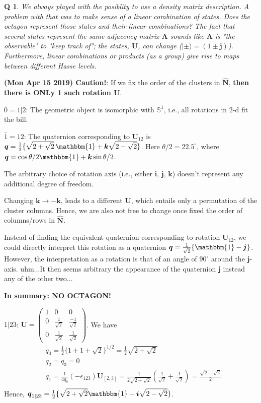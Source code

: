 \documentclass[twocolumn,aps,sort,nofootinbib]{revtex4}
\newtheorem{question}{Q}
\begin{document}
\begin{question}
	We always played  with the posiblity to use a density matrix description. A problem with that was to make sense of a linear combination of \textit{states}.
	Does the octagon represent those states and their linear combinations? The fact that several states represent the same adjacency matrix $\boldsymbol{A}$
	sounds like $\boldsymbol{A}$ is "the observable" to "keep track of"; the \textit{states,} $\boldsymbol{U}$, can change ($\mid\pm\rangle=(1\pm\boldsymbol{j})$). 
	Furthermore, linear combinations or products (as a group) give rise to maps between different Hasse levels.
\end{question}
	\textbf{(Mon Apr 15 2019) Caution!}: If we fix the order of the clusters in $\boldsymbol{\hat{N}}$, \textbf{then there is ONLy 1 such rotation $\boldsymbol{U}$}.

	\textbf{$\bar{0}=1|2$}: The geometric object is isomorphic with $\mathbb{S}^1$, i.e., all rotations in $2$-d fit the bill.

	\textbf{$\bar{1}=12$}: The quaternion corresponding to $\boldsymbol{U}_{12}$ is $\boldsymbol{q}=\frac{1}{2}\{\sqrt{2+\sqrt{2}}\,\mathbbm{1}+\boldsymbol{k}\sqrt{2-\sqrt{2}}\}$.
	Here $\theta/2=22.5^\circ$, where $\boldsymbol{q}=\cos{\theta/2}\mathbbm{1}+\boldsymbol{k}\sin{\theta/2}$.

	The arbitrary choice of rotation axis (i.e., either $\boldsymbol{i},\,\boldsymbol{j},\,\boldsymbol{k}$) doesn't represent any additional degree of freedom.

	Changing $\boldsymbol{k}\to -\boldsymbol{k}$, leads to a different $\boldsymbol{U}$, which entails only a permutation of the cluster columns. Hence, we are also not
	free to change once fixed the order of columns/rows in $\boldsymbol{\hat{N}}$.

	Instead of finding the equivalent quaternion corresponding to rotation $\boldsymbol{U}_{12}$, we could directly interpret this rotation as a quaternion
$\boldsymbol{q}=\frac{1}{\sqrt{2}}\{\mathbbm{1}-\boldsymbol{j}\}$. However, the interpretation as a rotation is that of an angle of $90^\circ$ around
the $\boldsymbol{j}$-axis. uhm...It then seems arbitrary the appearance of the quaternion $\boldsymbol{j}$ instead any of the other two...

	\textbf{In summary: NO OCTAGON!}

	\textbf{$1|23$}: $\boldsymbol{U}=\begin{pmatrix}1&0&0\\0&\frac{1}{\sqrt{2}}&\frac{-1}{\sqrt{2}}\\0&\frac{1}{\sqrt{2}}&\frac{1}{\sqrt{2}}\end{pmatrix}$.
	We have 
	\begin{align*}
		&q_0=\frac{1}{2}\{1+1+\sqrt{2}\}^{1/2}=\frac{1}{2}\sqrt{2+\sqrt{2}}\\
		&q_2=q_3=0\\
		&q_1=\frac{1}{4q_0}(-\epsilon_{123})\boldsymbol{U}_{[2,3]}=\frac{1}{2\sqrt{2+\sqrt{2}}}(\frac{1}{\sqrt{2}}+\frac{1}{\sqrt{2}})=\frac{\sqrt{2-\sqrt{2}}}{2}\\
	\end{align*}
	Hence, $\boldsymbol{q}_{1|23}=\frac{1}{2}\{\sqrt{2+\sqrt{2}}\mathbbm{1}+\boldsymbol{i}\sqrt{2-\sqrt{2}}\}$.
\end{document}
